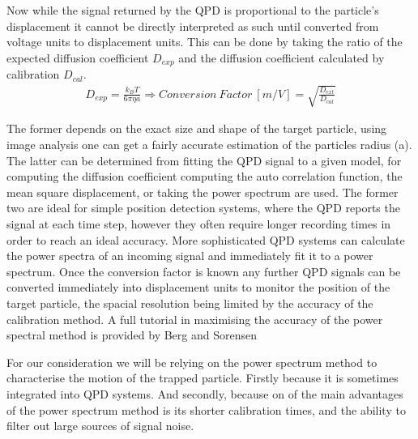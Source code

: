 Now while the signal returned by the QPD is proportional to the particle's
displacement it cannot be directly interpreted as such until converted
from voltage units to displacement units. This can be done by taking the 
ratio of the expected diffusion coefficient $D_{exp}$ and the diffusion 
coefficient calculated by calibration $D_{cal}$.
\begin{align}
	\label{eq:conversion_factor}
	D_{exp} = \frac{k_BT}{6\pi\eta a} \Rightarrow Conversion\ Factor \ [m/V]= \sqrt{\frac{D_{ext}}{D_{cal}}}
\end{align}

The former depends on the exact size and shape of the target particle, 
using image analysis one can get a fairly accurate estimation of the particles radius (a). The latter can be determined from fitting the QPD signal to a given model, for computing the diffusion coefficient 
computing the auto correlation function, the mean square displacement, 
or taking the power spectrum are used. The former two are ideal for 
simple position detection systems, where the QPD reports the signal at 
each time step, however they often require longer recording times in 
order to reach an ideal accuracy. More sophisticated QPD systems can calculate the power spectra of an incoming signal and immediately fit 
it to a power spectrum. Once the conversion factor is known any further 
QPD signals can be converted immediately into displacement units to monitor
the position of the target particle, the spacial resolution being  
limited by the accuracy of the calibration method. A full tutorial in 
maximising the accuracy of the power spectral method is provided by 
Berg and Sorensen \cite{BergSoerensen2004}

For our consideration we will be relying on the power spectrum method 
to characterise the motion of the trapped particle. Firstly because
it is sometimes integrated into QPD systems. And secondly, because 
on of the main advantages of the power spectrum method is its shorter 
calibration times, and the ability to filter out large sources of signal 
noise. 

